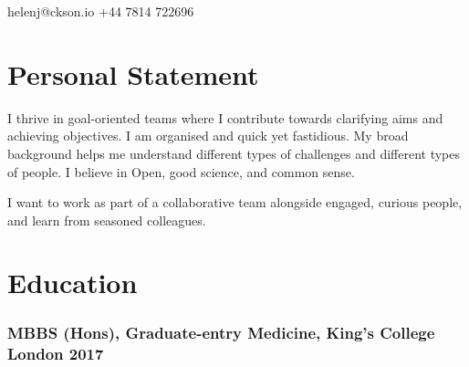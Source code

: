 \documentclass[a4paper, oneside, final, 11pt]{scrartcl} %
\begin{document}



\bigskip

\faEnvelopeO \space helenj@ckson.io \hfill  \faMobile \space +44 7814 722696

\medskip

\section{Personal Statement}
I thrive in goal-oriented teams where I contribute towards clarifying aims and achieving objectives.
I am organised and quick yet fastidious.
My broad background helps me understand different types of challenges and different types of people.
I believe in Open, good science, and common sense.\par
\medskip
I want to work as part of a collaborative team alongside engaged, curious people, and learn from seasoned colleagues.


\section{Education}

\subsubsection*{MBBS (Hons), Graduate-entry Medicine, King's College London \hfill 2017}  
\end{document}
